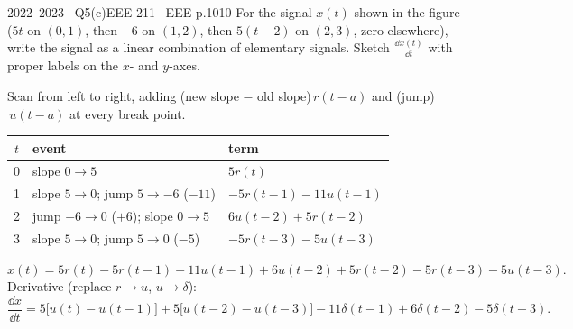 \begin{qcard}{2022--2023 \textbullet\ Q5(c)}{EEE 211 \textbullet\ EEE p.10}{10}
For the signal $x(t)$ shown in the figure ($5t$ on $(0,1)$, then $-6$ on $(1,2)$, then $5(t-2)$ on $(2,3)$, zero elsewhere), write the signal as a linear combination of elementary signals. Sketch $\frac{\dd x(t)}{\dd t}$ with proper labels on the $x$- and $y$-axes.
\end{qcard}
\begin{solution}
Scan from left to right, adding (new slope $-$ old slope)$\,r(t-a)$ and (jump)$\,u(t-a)$ at every break point.
\begin{center}\small\begin{tabular}{@{}cll@{}}\toprule
$t$ & event & term\\\midrule
0 & slope $0\to5$ & $5r(t)$\\
1 & slope $5\to0$; jump $5\to-6$ ($-11$) & $-5r(t-1)-11u(t-1)$\\
2 & jump $-6\to0$ ($+6$); slope $0\to5$ & $6u(t-2)+5r(t-2)$\\
3 & slope $5\to0$; jump $5\to0$ ($-5$) & $-5r(t-3)-5u(t-3)$\\\bottomrule
\end{tabular}\end{center}
\[
x(t)=5r(t)-5r(t-1)-11u(t-1)+6u(t-2)+5r(t-2)-5r(t-3)-5u(t-3).
\]
Derivative (replace $r\to u$, $u\to\delta$):
\[
\frac{\dd x}{\dd t}=5\big[u(t)-u(t-1)\big]+5\big[u(t-2)-u(t-3)\big]-11\delta(t-1)+6\delta(t-2)-5\delta(t-3).
\]
\begin{center}
\end{center}
\end{solution}


